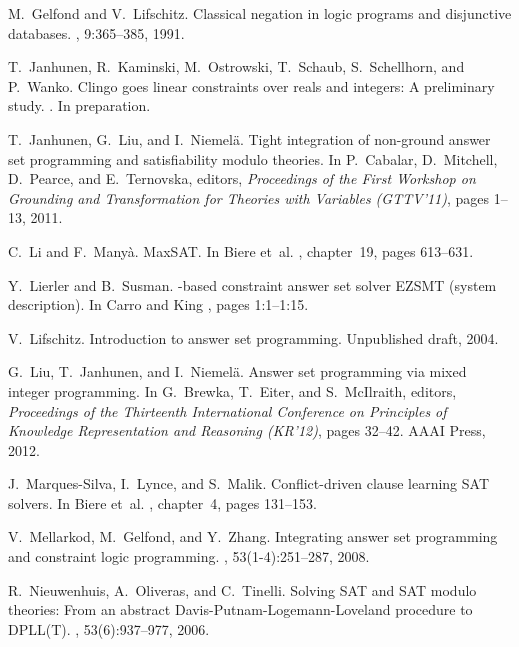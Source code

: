 \begin{thebibliography}{10}
M.~Gelfond and V.~Lifschitz.
\newblock Classical negation in logic programs and disjunctive databases.
, 9:365--385, 1991.

T.~Janhunen, R.~Kaminski, M.~Ostrowski, T.~Schaub, S.~Schellhorn, and P.~Wanko.
\newblock Clingo goes linear constraints over reals and integers: A preliminary
  study.
.
\newblock In preparation.

T.~Janhunen, G.~Liu, and I.~Niemelä.
\newblock Tight integration of non-ground answer set programming and
  satisfiability modulo theories.
\newblock In P.~Cabalar, D.~Mitchell, D.~Pearce, and E.~Ternovska, editors,
  {\em Proceedings of the First Workshop on Grounding and Transformation for
  Theories with Variables (GTTV'11)}, pages 1--13, 2011.

C.~Li and F.~Many{\`a}.
\newblock Max{SAT}.
\newblock In Biere et~al. \cite{SATHandbook}, chapter~19, pages 613--631.

Y.~Lierler and B.~Susman.
-based constraint answer set solver {EZSMT} (system
  description).
\newblock In Carro and King \cite{iclp-lipics16}, pages 1:1--1:15.

V.~Lifschitz.
\newblock Introduction to answer set programming.
\newblock Unpublished draft, 2004.

G.~Liu, T.~Janhunen, and I.~Niemelä.
\newblock Answer set programming via mixed integer programming.
\newblock In G.~Brewka, T.~Eiter, and S.~McIlraith, editors, {\em Proceedings
  of the Thirteenth International Conference on Principles of Knowledge
  Representation and Reasoning (KR'12)}, pages 32--42. AAAI Press, 2012.

J.~Marques-Silva, I.~Lynce, and S.~Malik.
\newblock Conflict-driven clause learning {SAT} solvers.
\newblock In Biere et~al. \cite{SATHandbook}, chapter~4, pages 131--153.

V.~Mellarkod, M.~Gelfond, and Y.~Zhang.
\newblock Integrating answer set programming and constraint logic programming.
,
  53(1-4):251--287, 2008.

R.~Nieuwenhuis, A.~Oliveras, and C.~Tinelli.
\newblock Solving {SAT} and {SAT} modulo theories: From an abstract
  {D}avis-{P}utnam-{L}ogemann-{L}oveland procedure to {DPLL}({T}).
, 53(6):937--977, 2006.


\end{thebibliography}
